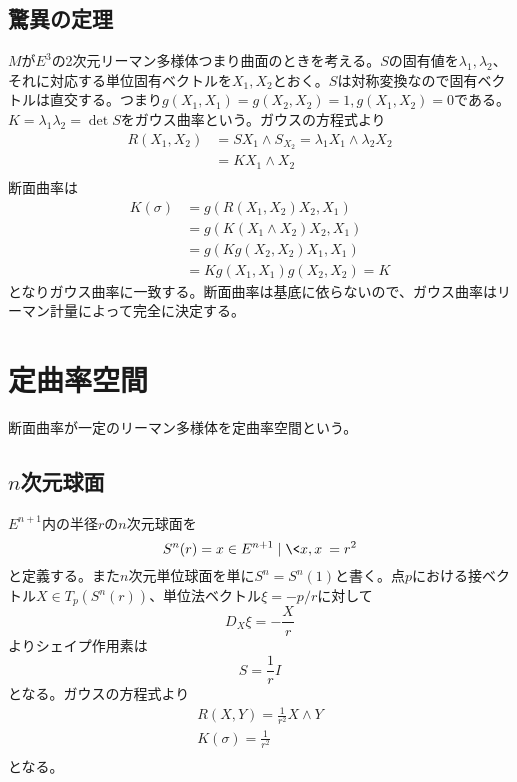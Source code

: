     \subsection{驚異の定理}
        $M$が$E^3$の2次元リーマン多様体つまり曲面のときを考える。$S$の固有値を$\lambda_1, \lambda_2$、それに対応する単位固有ベクトルを$X_1, X_2$とおく。$S$は対称変換なので固有ベクトルは直交する。つまり$g(X_1, X_1) = g(X_2, X_2) = 1, g(X_1, X_2) = 0$である。$K = \lambda_1\lambda_2 = \det S$をガウス曲率という。ガウスの方程式より
        \begin{align*}
            R(X_1, X_2)
            &= SX_1 \wedge S_X_2 = \lambda_1X_1 \wedge \lambda_2X_2\\
            &= KX_1 \wedge X_2\\
        \end{align*}
        断面曲率は
        \begin{align*}
            K(\sigma) &= g(R(X_1, X_2)X_2, X_1)\\
            &= g(K(X_1 \wedge X_2)X_2, X_1)\\
            &= g(Kg(X_2, X_2)X_1, X_1)\\
            &= Kg(X_1, X_1)g(X_2, X_2) = K
        \end{align*}
        となりガウス曲率に一致する。断面曲率は基底に依らないので、ガウス曲率はリーマン計量によって完全に決定する。

\section{定曲率空間}
    断面曲率が一定のリーマン多様体を定曲率空間という。
    \subsection{$n$次元球面}
        $E^{n+1}$内の半径$r$の$n$次元球面を
            \[S^n(r) = {x \in E^{n+1} \mid \<x, x\> = r^2}\]
        と定義する。また$n$次元単位球面を単に$S^n = S^n(1)$と書く。点$p$における接ベクトル$X \in T_p(S^n(r))$、単位法ベクトル$\xi = -p/r$に対して
            \[D_X\xi = -\frac{X}{r}\]
        よりシェイプ作用素は
            \[S = \frac{1}{r}I\]
        となる。ガウスの方程式より
        \begin{align*}
            R(X, Y) = \frac{1}{r^2}X \wedge Y\\
            K(\sigma) = \frac{1}{r^2}\\
        \end{align*}
        となる。
